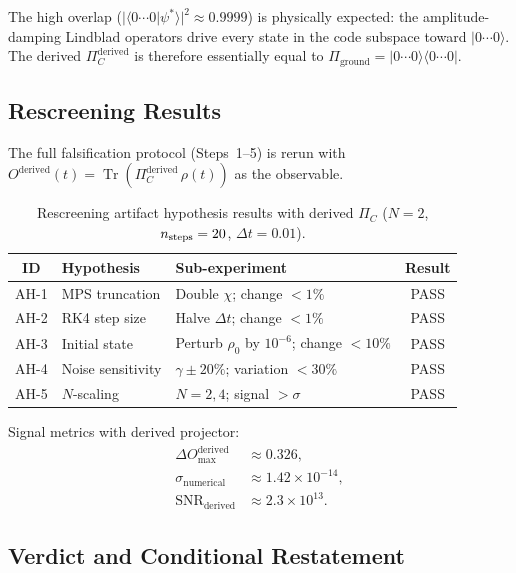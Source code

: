 \begin{remark}
  The high overlap ($|\langle 0{\cdots}0|\psi^*\rangle|^2 \approx 0.9999$) is
  physically expected: the amplitude-damping Lindblad operators drive every
  state in the code subspace toward $|0{\cdots}0\rangle$.  The derived
  $\Pi_C^{\mathrm{derived}}$ is therefore essentially equal to
  $\Pi_{\mathrm{ground}} = |0{\cdots}0\rangle\!\langle 0{\cdots}0|$.
\end{remark}

\subsection{Rescreening Results}

The full falsification protocol (Steps~1--5) is rerun with
$O^{\mathrm{derived}}(t) = \operatorname{Tr}(\Pi_C^{\mathrm{derived}}\,\rho(t))$
as the observable.

\begin{table}[ht]
\centering
\caption{Rescreening artifact hypothesis results with derived $\Pi_C$
  ($N=2$, $n_{\rm steps}=20$, $\Delta t=0.01$).}
\label{tab:ch22-rescreen}
\begin{tabular}{cllc}
\toprule
ID & Hypothesis & Sub-experiment & Result \\
\midrule
AH-1 & MPS truncation & Double $\chi$; change $<1\%$ & PASS \\
AH-2 & RK4 step size  & Halve $\Delta t$; change $<1\%$ & PASS \\
AH-3 & Initial state  & Perturb $\rho_0$ by $10^{-6}$; change $<10\%$ & PASS \\
AH-4 & Noise sensitivity & $\gamma \pm 20\%$; variation $<30\%$ & PASS \\
AH-5 & $N$-scaling & $N=2,4$; signal $> \sigma$ & PASS \\
\bottomrule
\end{tabular}
\end{table}

Signal metrics with derived projector:
\begin{align}
  \Delta O_{\max}^{\mathrm{derived}} &\approx 0.326, \\
  \sigma_{\mathrm{numerical}}         &\approx 1.42 \times 10^{-14}, \\
  \mathrm{SNR}_{\mathrm{derived}}     &\approx 2.3 \times 10^{13}.
\end{align}

\subsection{Verdict and Conditional Restatement}

